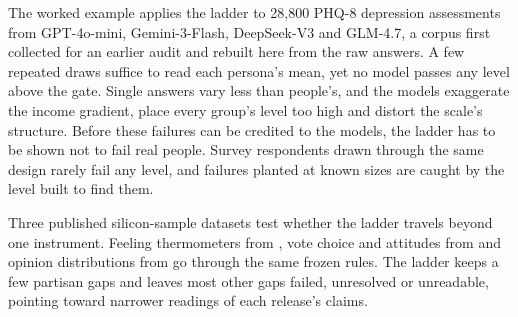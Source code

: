 The worked example applies the ladder to 28,800 PHQ-8 depression assessments from GPT-4o-mini, Gemini-3-Flash, DeepSeek-V3 and GLM-4.7, a corpus first collected for an earlier audit \citep{keough2026plausible} and rebuilt here from the raw answers. %
A few repeated draws suffice to read each persona's mean, yet no model passes any level above the gate.
Single answers vary less than people's, and the models exaggerate the income gradient, place every group's level too high and distort the scale's structure.
Before these failures can be credited to the models, the ladder has to be shown not to fail real people.
Survey respondents drawn through the same design rarely fail any level, and failures planted at known sizes are caught by the level built to find them.

Three published silicon-sample datasets test whether the ladder travels beyond one instrument.
Feeling thermometers from \citet{bisbee2024synthetic}, vote choice and attitudes from \citet{argyle2023outofone} and opinion distributions from \citet{meister2025distributional} go through the same frozen rules.
The ladder keeps a few partisan gaps and leaves most other gaps failed, unresolved or unreadable, pointing toward narrower readings of each release's claims.
